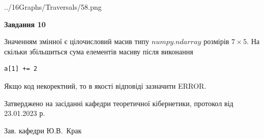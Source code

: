\documentclass[12pt, ukrainian]{article}
\begin{document}
{\begin {large}
\begin{center}
	{../16Graphs/Traversals/58.png}
\end{center}\par
\newpage

{\begin {center}\textbf{Завдання 10}\end {center}}\par
Значенням змінної  є цілочисловий масив типу $numpy.ndarray$ розмірів $7{\times}5$. На скільки збільшиться сума елементів масиву  після виконання
\begin{verbatim}
a[1] += 2
\end{verbatim}


Якщо код некоректний, то в якості відповіді зазначити ERROR.\par
\newpage


\end {large}
}
{\smallskip \begin {small} Затверджено на засіданні кафедри теоретичної кібернетики, протокол  від   23.01.2023 р.\par\smallskip\smallskip
{\parbox {6.5 cm}{Зав. кафедри \dotfill Ю.В.~Крак}} \end{small}}
\end{document}
